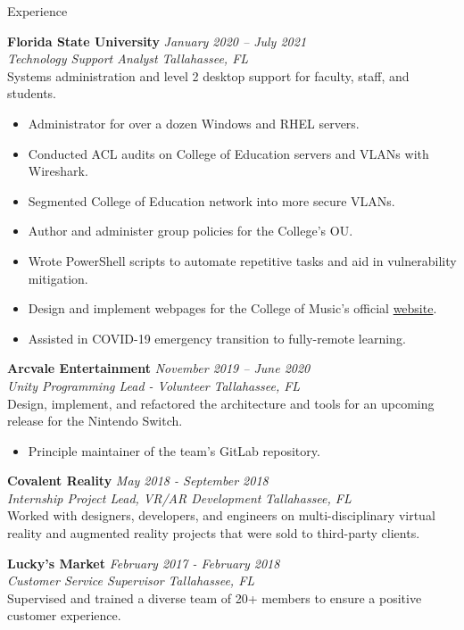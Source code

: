 \documentclass{resume} %
\begin{document}
	\begin{rSection}{Experience}
		
		{\bf Florida State University} \hfill {\em January 2020 – July 2021} \\
		\textit{Technology Support Analyst} \hfill {\em Tallahassee, FL} \smallskip \\
		Systems administration and level 2 desktop support for faculty, staff, and students.
		\begin{itemize}
			\vspace{-0.2cm} \item Administrator for over a dozen Windows and RHEL servers.
			\vspace{-0.2cm} \item Conducted ACL audits on College of Education servers and VLANs with Wireshark.
			\vspace{-0.2cm} \item Segmented College of Education network into more secure VLANs.\vspace{-0.2cm} \item Author and administer group policies for the College's OU.
			\vspace{-0.2cm} \item Wrote PowerShell scripts to automate repetitive tasks and aid in vulnerability mitigation.\vspace{-0.2cm} \item Design and implement webpages for the College of Music's official \href{https://music.fsu.edu/online-audition-forms}{website}.
			\vspace{-0.2cm}\item Assisted in COVID-19 emergency transition to fully-remote learning.
		\end{itemize}
		{\bf Arcvale Entertainment} \hfill {\em November 2019 – June 2020}\\
		\textit{Unity Programming Lead - Volunteer} \hfill {\em Tallahassee, FL} \smallskip \\
		Design, implement, and refactored the architecture and tools for an upcoming release for the Nintendo Switch.
		\begin{itemize}
			\vspace{-0.2cm} \item Principle maintainer of the team's GitLab repository.
		\end{itemize}
		{\bf Covalent Reality} \hfill {\em May 2018 - September 2018}\\
		\textit{Internship Project Lead, VR/AR Development} \hfill {\em Tallahassee, FL} \smallskip \\
		Worked with designers, developers, and engineers on multi-disciplinary virtual reality and augmented reality projects that were sold to third-party clients.
		
		{\bf Lucky's Market} \hfill {\em February 2017 - February 2018}\\
		\textit{Customer Service Supervisor} \hfill {\em Tallahassee, FL} \smallskip \\
		Supervised and trained a diverse team of 20+ members to ensure a positive customer experience.
		
	\end{rSection}
	
\end{document}
